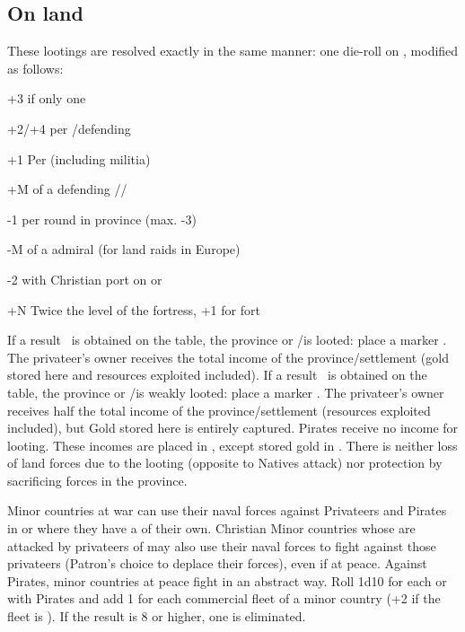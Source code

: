 \subsection{On land}
 These lootings are resolved
exactly in the same manner: one die-roll on , modified as follows:
\begin{modlist}
\item[+3] if only one \corsaire\facemoins
\item[+2/+4] per \ARMY\facemoins/\Faceplus defending
\item[+1] Per \LD (including militia) %
\item[+M] \Man of a defending \LeaderG/\LeaderC/\LeaderGov
\item[-1] per round in province (max. -3) %
\item[-M] \Man of a \corsaire admiral (\textonehalf for land raids in Europe)
\item[-2]  with Christian port on  or
\item[+N] Twice the level of the fortress, +1 for fort
\end{modlist}
\bparag If a result \textddag\ is obtained on the table, the province or
\TP/\COL is looted: place a marker \PILLAGE\faceplus. The privateer's owner
receives the total income of the province/settlement (gold stored here and
resources exploited included).
\bparag If a result \textdag\ is obtained on the table, the province or
\TP/\COL is weakly looted: place a marker \PILLAGE\facemoins. The privateer's
owner receives half the total income of the province/settlement (resources
exploited included), but Gold stored here is entirely captured.
\bparag Pirates receive no income for looting.
\bparag These incomes are placed in , except
stored gold in .
\bparag There is neither loss of land forces due to the looting (opposite to
Natives attack) nor protection by sacrificing forces in the province.

\bparag Minor countries at war can use their naval forces against Privateers
and Pirates in \STZ or \CTZ where they have a \TradeFLEET of their own.
\bparag Christian Minor countries whose \TradeFLEET are attacked by privateers
of  may also use their naval forces to fight against those
privateers (Patron's choice to deplace their forces), even if at peace.
\bparag Against Pirates, minor countries at peace fight in an abstract way.
Roll 1d10 for each \STZ or \CTZ with Pirates and add 1 for each commercial
fleet of a minor country (+2 if the fleet is \Faceplus).  If the result is 8
or higher, one \corsaire\facemoins is eliminated.



